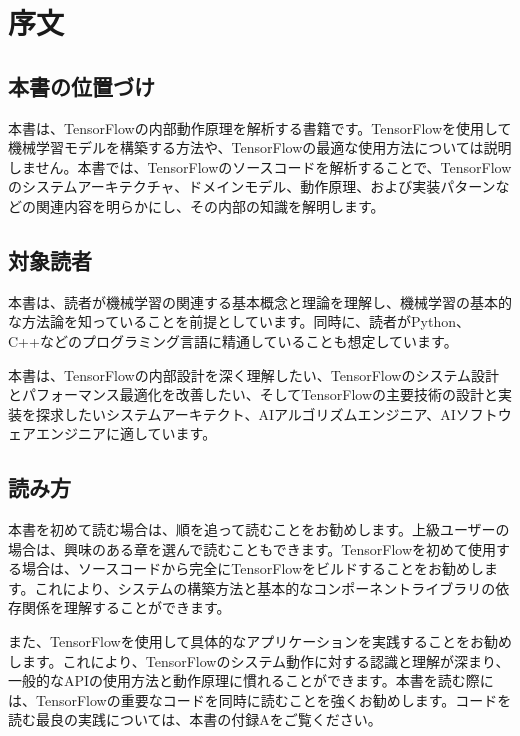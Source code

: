 \chapter{序文} 
\label{ch:preface}

\section*{本書の位置づけ}

\begin{content}

本書は、TensorFlowの内部動作原理を解析する書籍です。TensorFlowを使用して機械学習モデルを構築する方法や、TensorFlowの最適な使用方法については説明しません。本書では、TensorFlowのソースコードを解析することで、TensorFlowのシステムアーキテクチャ、ドメインモデル、動作原理、および実装パターンなどの関連内容を明らかにし、その内部の知識を解明します。

\end{content}


\section*{対象読者}

\begin{content}

本書は、読者が機械学習の関連する基本概念と理論を理解し、機械学習の基本的な方法論を知っていることを前提としています。同時に、読者がPython、C++などのプログラミング言語に精通していることも想定しています。

本書は、TensorFlowの内部設計を深く理解したい、TensorFlowのシステム設計とパフォーマンス最適化を改善したい、そしてTensorFlowの主要技術の設計と実装を探求したいシステムアーキテクト、AIアルゴリズムエンジニア、AIソフトウェアエンジニアに適しています。

\end{content}

\section*{読み方}

\begin{content}

本書を初めて読む場合は、順を追って読むことをお勧めします。上級ユーザーの場合は、興味のある章を選んで読むこともできます。TensorFlowを初めて使用する場合は、ソースコードから完全にTensorFlowをビルドすることをお勧めします。これにより、システムの構築方法と基本的なコンポーネントライブラリの依存関係を理解することができます。

また、TensorFlowを使用して具体的なアプリケーションを実践することをお勧めします。これにより、TensorFlowのシステム動作に対する認識と理解が深まり、一般的なAPIの使用方法と動作原理に慣れることができます。本書を読む際には、TensorFlowの重要なコードを同時に読むことを強くお勧めします。コードを読む最良の実践については、本書の付録Aをご覧ください。

\end{content}

